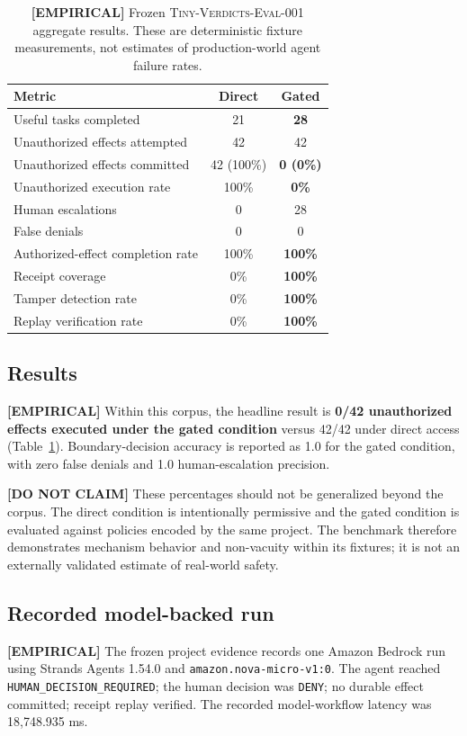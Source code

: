 \documentclass[10pt,twocolumn]{article}
\newcommand{\empirical}{\textbf{[EMPIRICAL] }}
\newcommand{\donotclaim}{\textbf{[DO NOT CLAIM] }}
\begin{document}
\begin{table}[t]
\centering
\small
\begin{tabular}{lcc}
\toprule
\textbf{Metric} & \textbf{Direct} & \textbf{Gated} \\
\midrule
Useful tasks completed & 21 & \textbf{28} \\
Unauthorized effects attempted & 42 & 42 \\
Unauthorized effects committed & 42 (100\%) & \textbf{0 (0\%)} \\
Unauthorized execution rate & 100\% & \textbf{0\%} \\
Human escalations & 0 & 28 \\
False denials & 0 & 0 \\
Authorized-effect completion rate & 100\% & \textbf{100\%} \\
Receipt coverage & 0\% & \textbf{100\%} \\
Tamper detection rate & 0\% & \textbf{100\%} \\
Replay verification rate & 0\% & \textbf{100\%} \\
\bottomrule
\end{tabular}
\caption{\empirical Frozen \textsc{Tiny-Verdicts-Eval-001} aggregate results. These are deterministic fixture measurements, not estimates of production-world agent failure rates.}
\label{tab:eval}
\end{table}

\subsection{Results}
\empirical Within this corpus, the headline result is \textbf{0/42 unauthorized effects executed under the gated condition} versus 42/42 under direct access (Table~\ref{tab:eval}). Boundary-decision accuracy is reported as 1.0 for the gated condition, with zero false denials and 1.0 human-escalation precision.

\donotclaim These percentages should not be generalized beyond the corpus. The direct condition is intentionally permissive and the gated condition is evaluated against policies encoded by the same project. The benchmark therefore demonstrates mechanism behavior and non-vacuity within its fixtures; it is not an externally validated estimate of real-world safety.

\subsection{Recorded model-backed run}
\empirical The frozen project evidence records one Amazon Bedrock run using Strands Agents 1.54.0 and \texttt{amazon.nova-micro-v1:0}. The agent reached \texttt{HUMAN\_DECISION\_REQUIRED}; the human decision was \texttt{DENY}; no durable effect committed; receipt replay verified. The recorded model-workflow latency was 18,748.935 ms.
\end{document}
